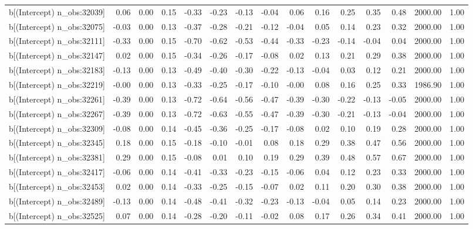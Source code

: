 \begin{table}[ht]
\begin{tabular}{rrrrrrrrrrrrrrr}
  b[(Intercept) n\_obs:32039] & 0.06 & 0.00 & 0.15 & -0.33 & -0.23 & -0.13 & -0.04 & 0.06 & 0.16 & 0.25 & 0.35 & 0.48 & 2000.00 & 1.00 \\ 
  b[(Intercept) n\_obs:32075] & -0.03 & 0.00 & 0.13 & -0.37 & -0.28 & -0.21 & -0.12 & -0.04 & 0.05 & 0.14 & 0.23 & 0.32 & 2000.00 & 1.00 \\ 
  b[(Intercept) n\_obs:32111] & -0.33 & 0.00 & 0.15 & -0.70 & -0.62 & -0.53 & -0.44 & -0.33 & -0.23 & -0.14 & -0.04 & 0.04 & 2000.00 & 1.00 \\ 
  b[(Intercept) n\_obs:32147] & 0.02 & 0.00 & 0.15 & -0.34 & -0.26 & -0.17 & -0.08 & 0.02 & 0.13 & 0.21 & 0.29 & 0.38 & 2000.00 & 1.00 \\ 
  b[(Intercept) n\_obs:32183] & -0.13 & 0.00 & 0.13 & -0.49 & -0.40 & -0.30 & -0.22 & -0.13 & -0.04 & 0.03 & 0.12 & 0.21 & 2000.00 & 1.00 \\ 
  b[(Intercept) n\_obs:32219] & -0.00 & 0.00 & 0.13 & -0.33 & -0.25 & -0.17 & -0.10 & -0.00 & 0.08 & 0.16 & 0.25 & 0.33 & 1986.90 & 1.00 \\ 
  b[(Intercept) n\_obs:32261] & -0.39 & 0.00 & 0.13 & -0.72 & -0.64 & -0.56 & -0.47 & -0.39 & -0.30 & -0.22 & -0.13 & -0.05 & 2000.00 & 1.00 \\ 
  b[(Intercept) n\_obs:32267] & -0.39 & 0.00 & 0.13 & -0.72 & -0.63 & -0.55 & -0.47 & -0.39 & -0.30 & -0.21 & -0.13 & -0.04 & 2000.00 & 1.00 \\ 
  b[(Intercept) n\_obs:32309] & -0.08 & 0.00 & 0.14 & -0.45 & -0.36 & -0.25 & -0.17 & -0.08 & 0.02 & 0.10 & 0.19 & 0.28 & 2000.00 & 1.00 \\ 
  b[(Intercept) n\_obs:32345] & 0.18 & 0.00 & 0.15 & -0.18 & -0.10 & -0.01 & 0.08 & 0.18 & 0.29 & 0.38 & 0.47 & 0.56 & 2000.00 & 1.00 \\ 
  b[(Intercept) n\_obs:32381] & 0.29 & 0.00 & 0.15 & -0.08 & 0.01 & 0.10 & 0.19 & 0.29 & 0.39 & 0.48 & 0.57 & 0.67 & 2000.00 & 1.00 \\ 
  b[(Intercept) n\_obs:32417] & -0.06 & 0.00 & 0.14 & -0.41 & -0.33 & -0.23 & -0.15 & -0.06 & 0.04 & 0.12 & 0.23 & 0.33 & 2000.00 & 1.00 \\ 
  b[(Intercept) n\_obs:32453] & 0.02 & 0.00 & 0.14 & -0.33 & -0.25 & -0.15 & -0.07 & 0.02 & 0.11 & 0.20 & 0.30 & 0.38 & 2000.00 & 1.00 \\ 
  b[(Intercept) n\_obs:32489] & -0.13 & 0.00 & 0.14 & -0.48 & -0.41 & -0.32 & -0.23 & -0.13 & -0.04 & 0.05 & 0.14 & 0.23 & 2000.00 & 1.00 \\ 
  b[(Intercept) n\_obs:32525] & 0.07 & 0.00 & 0.14 & -0.28 & -0.20 & -0.11 & -0.02 & 0.08 & 0.17 & 0.26 & 0.34 & 0.41 & 2000.00 & 1.00 \\ 

\end{tabular}
\end{table}
